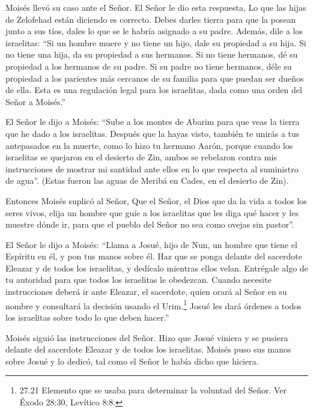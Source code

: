  Moisés llevó su caso ante el Señor.  El Señor
le dio esta respuesta,  Lo que las hijas de Zelofehad están
diciendo es correcto. Debes darles tierra para que la posean junto a sus
tíos, dales lo que se le habría asignado a su padre. 
Además, dile a los israelitas: ``Si un hombre muere y no tiene un hijo,
dale su propiedad a su hija.  Si no tiene una hija, da su
propiedad a sus hermanos.  Si no tiene hermanos, dé su
propiedad a los hermanos de su padre.  Si su padre no tiene
hermanos, déle su propiedad a los parientes más cercanos de su familia
para que puedan ser dueños de ella. Esta es una regulación legal para
los israelitas, dada como una orden del Señor a Moisés.''

 El Señor le dijo a Moisés: ``Sube a los montes de Abarim
para que veas la tierra que he dado a los israelitas. 
Después que la hayas visto, también te unirás a tus antepasados en la
muerte, como lo hizo tu hermano Aarón,  porque cuando los
israelitas se quejaron en el desierto de Zin, ambos se rebelaron contra
mis instrucciones de mostrar mi santidad ante ellos en lo que respecta
al suministro de agua''. (Estas fueron las aguas de Meribá en Cades, en
el desierto de Zin).

 Entonces Moisés suplicó al Señor,  Que el
Señor, el Dios que da la vida a todos los seres vivos, elija un hombre
que guíe a los israelitas  que les diga qué hacer y les
muestre dónde ir, para que el pueblo del Señor no sea como ovejas sin
pastor''.

 El Señor le dijo a Moisés: ``Llama a Josué, hijo de Nun,
un hombre que tiene el Espíritu en él, y pon tus manos sobre él.
 Haz que se ponga delante del sacerdote Eleazar y de todos
los israelitas, y dedícalo mientras ellos velan.  Entrégale
algo de tu autoridad para que todos los israelitas le obedezcan.
 Cuando necesite instrucciones deberá ir ante Eleazar, el
sacerdote, quien orará al Señor en su nombre y consultará la decisión
usando el Urim.\footnote{27.21 Elemento que se usaba para determinar la
  voluntad del Señor. Ver Éxodo 28:30, Levítico 8:8.} Josué les dará
órdenes a todos los israelitas sobre todo lo que deben hacer.''

 Moisés siguió las instrucciones del Señor. Hizo que Josué
viniera y se pusiera delante del sacerdote Eleazar y de todos los
israelitas.  Moisés puso sus manos sobre Josué y lo dedicó,
tal como el Señor le había dicho que hiciera.


